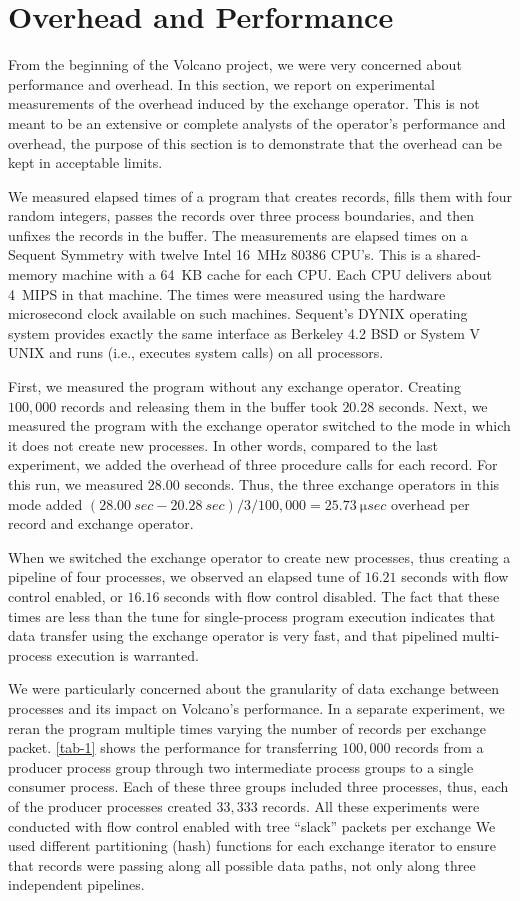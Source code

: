 \documentclass[a4paper,12pt,notitlepage,twoside,openright]{article}
\begin{document}
\section{Overhead and Performance}

From the beginning of the Volcano project, we were
very concerned about performance and overhead. In this
section, we report on experimental measurements of the
overhead induced by the exchange operator. This is not
meant to be an extensive or complete analysts of the
operator's performance and overhead, the purpose of this
section is to demonstrate that the overhead can be kept in
acceptable limits.

We measured elapsed times of a program that creates
records, fills them with four random integers, passes the
records over three process boundaries, and then unfixes the
records in the buffer. The measurements are elapsed times
on a Sequent Symmetry with twelve Intel \SI{16}{\mega\hertz} 80386
CPU's. This is a shared-memory machine with a \SI{64}{KB}
cache for each CPU. Each CPU delivers about \SI{4}{MIPS} in
that machine. The times were measured using the hardware
microsecond clock available on such machines. Sequent's
DYNIX operating system provides exactly the same interface
as Berkeley 4.2 BSD or System V UNIX and runs
(i.e., executes system calls) on all processors.

First, we measured the program without any exchange
operator. Creating $100,000$ records and releasing them in
the buffer took $20.28$ seconds. Next, we measured the program
with the exchange operator switched to the mode in
which it does not create new processes. In other words,
compared to the last experiment, we added the overhead of
three procedure calls for each record. For this run, we
measured $28.00$ seconds. Thus, the three exchange operators
in this mode added $(\SI{28.00}{sec} - \SI{20.28}{sec}) / 3 / 100,000
= \SI{25.73}{\micro sec}$ overhead per record and exchange operator.

When we switched the exchange operator to create
new processes, thus creating a pipeline of four processes,
we observed an elapsed tune of $16.21$ seconds with flow
control enabled, or $16.16$ seconds with flow control disabled.
The fact that these times are less than the tune for
single-process program execution indicates that data transfer
using the exchange operator is very fast, and that pipelined
multi-process execution is warranted.

We were particularly concerned about the granularity
of data exchange between processes and its impact on
Volcano's performance. In a separate experiment, we reran
the program multiple times varying the number of records
per exchange packet. \autoref{tab-1} shows the performance for
transferring $100,000$ records from a producer process group
through two intermediate process groups to a single
consumer process. Each of these three groups included
three processes, thus, each of the producer processes created
$33,333$ records. All these experiments were conducted with
flow control enabled with tree ``slack'' packets per
exchange We used different partitioning (hash) functions
for each exchange iterator to ensure that records were passing
along all possible data paths, not only along three
independent pipelines.
\end{document}
